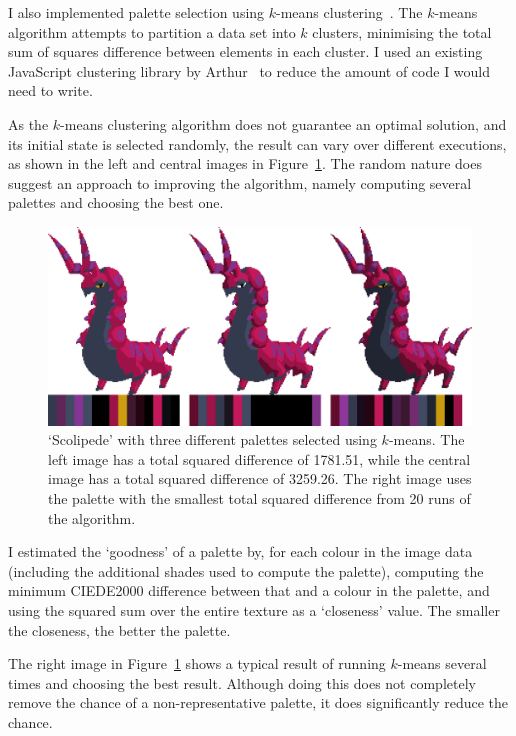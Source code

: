 \documentclass[12pt,twoside,notitlepage]{report}
\begin{document}
I also implemented palette selection using $k$-means clustering~\cite{macqueen1967}. The $k$-means algorithm attempts to partition a data set into $k$ clusters, minimising the total sum of squares difference between elements in each cluster. I used an existing JavaScript clustering library by Arthur~\cite{Arthur:clusterfck} to reduce the amount of code I would need to write.

As the $k$-means clustering algorithm does not guarantee an optimal solution, and its initial state is selected randomly, the result can vary over different executions, as shown in the left and central images in Figure~\ref{fig:kmeansexample}. The random nature does suggest an approach to improving the algorithm, namely computing several palettes and choosing the best one.

\begin{figure}[h!]
\centering
\includegraphics[width=\textwidth]{kmeans}
\caption{`Scolipede' with three different palettes selected using $k$-means. The left image has a total squared difference of 1781.51, while the central image has a total squared difference of 3259.26. The right image uses the palette with the smallest total squared difference from 20 runs of the algorithm.}
\label{fig:kmeansexample}
\end{figure}

I estimated the `goodness' of a palette by, for each colour in the image data (including the additional shades used to compute the palette), computing the minimum CIEDE2000 difference between that and a colour in the palette, and using the squared sum over the entire texture as a `closeness' value. The smaller the closeness, the better the palette.

The right image in Figure~\ref{fig:kmeansexample} shows a typical result of running $k$-means several times and choosing the best result. Although doing this does not completely remove the chance of a non-representative palette, it does significantly reduce the chance.
\end{document}
